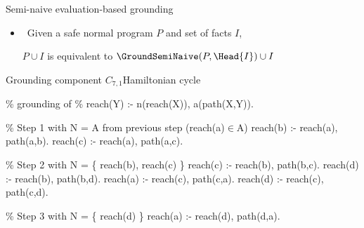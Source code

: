 \begin{frame}{Semi-naive evaluation-based grounding}
  \vspace*{-10pt}\small%
  \begin{center}
  \end{center}
  \smallskip
  \begin{itemize}
    \item<2->  \ Given a safe normal program \(P\) and set of facts \(I\),

      \(P \cup I\) is equivalent to \(\GroundSemiNaive(P,\Head{I}) \cup I\)
  \end{itemize}
\end{frame}
\begin{frame}{Grounding component \(C_{7,1}\)}{Hamiltonian cycle}
  \begin{SemiVerbatim}[\small]{.9}
    {\color{comment}\% grounding of
    \% reach(Y) :- {n(reach(X))}, a(path(X,Y)).}

    {\color{comment}\% Step 1 with N = A from previous step (reach(a)\({}\in{}\)A)}
    \alert{reach(b)} :- \alert{reach(a)}\only<1>{)}, path(a,b).
    \alert{reach(c)} :- \alert{reach(a)}\only<1>{)}, path(a,c).

    {\color{comment}\% Step 2 with N = \{ reach(b), reach(c) \}}
    reach(c) :- \alert{reach(b)}\only<1>{)}, path(b,c).
    \alert{reach(d)} :- \alert{reach(b)}\only<1>{)}, path(b,d).
    reach(a) :- \alert{reach(c)}, path(c,a).
    \alert{reach(d)} :- \alert{reach(c)}\only<1>{)}, path(c,d).

    {\color{comment}\% Step 3 with N = \{ reach(d) \}}
    reach(a) :- \alert{reach(d)}\only<1>{)}, path(d,a).

  \end{SemiVerbatim}
\end{frame}
